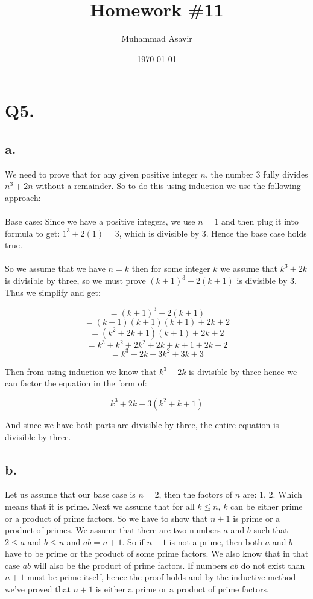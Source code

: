 \documentclass[titlepage]{article}\pagestyle{empty}
\author{Muhammad Asavir}
\title{Homework \#11}
\date{\today}
\begin{document}
\maketitle

\pagebreak
\section*{Q5.}
\subsection*{a.}
We need to prove that for any given positive integer $n$, the number $3$ fully divides $n^3 + 2n$ without a remainder. So to do this using induction we use the following approach:\\~\\
Base case: Since we have a positive integers, we use $n = 1$ and then plug it into formula to get: $1^3 + 2(1) = 3$, which is divisible by $3$. Hence the base case holds true.\\~\\
So we assume that we have $n = k$ then for some integer $k$ we assume that $k^3 + 2k$ is divisible by three, so we must prove $(k+1)^3 + 2(k+1)$ is divisible by 3. Thus we simplify and get:

\[=(k+1)^3 + 2(k+1)\]
\[=(k+1)(k+1)(k+1) + 2k + 2\]
\[=(k^2+2k+1)(k+1) + 2k+2\]
\[=k^3 + k^2+2k^2+2k+k+1+2k+2\]
\[=k^3+2k+3k^2+3k+3\]

Then from using induction we know that $k^3 + 2k$ is divisible by three hence we can factor the equation in the form of:

\[k^3+2k+3(k^2+k+1)\]

And since we have both parts are divisible by three, the entire equation is divisible by three.

\subsection*{b.}
Let us assume that our base case is $n = 2$, then the factors of $n$ are: $1$, $2$. Which means that it is prime. Next we assume that for all $k \leq n$, $k$ can be either prime or a product of prime factors. So we have to show that $n + 1$ is prime or a product of primes.
We assume that there are two numbers $a$ and $b$ such that $2 \leq a$ and $b \leq n$ and $ab = n + 1$. So if $n + 1$ is not a prime, then both $a$ and $b$ have to be prime or the product of some prime factors. We also know that in that case $ab$ will also be the product of prime factors. If numbers $ab$ do not exist than $n + 1$ must be prime itself, hence the proof holds and by the inductive method we've proved that $n + 1$ is either a prime or a product of prime factors.
\end{document}
